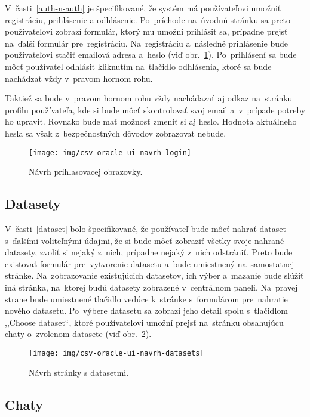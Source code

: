 V~časti~\ref{auth-n-auth} je špecifikované, že systém má používateľovi umožniť registráciu, prihlásenie a odhlásenie. Po~príchode na~úvodnú stránku sa preto používateľovi zobrazí formulár, ktorý mu umožní prihlásiť sa, prípadne prejsť na~ďalší formulár pre~registráciu. Na~registráciu a~následné prihlásenie bude používateľovi stačiť emailová adresa a~heslo (viď obr.~\ref{csv-oracle-ui-navrh-login}). Po~prihlásení sa bude môcť používateľ odhlásiť kliknutím na~tlačidlo odhlásenia, ktoré sa bude nachádzať vždy v~pravom hornom rohu.

Taktiež sa bude v~pravom hornom rohu vždy nachádazať aj odkaz na~stránku profilu používateľa, kde si bude môcť skontrolovať svoj email a~v~prípade potreby ho upraviť. Rovnako bude mať možnosť zmeniť si aj heslo. Hodnota aktuálneho hesla sa však z~bezpečnostných dôvodov zobrazovať nebude.

\begin{figure}[H]\centering
\texttt{[image: img/csv-oracle-ui-navrh-login]}
\caption{Návrh prihlasovacej obrazovky.}
\label{csv-oracle-ui-navrh-login}
\end{figure}

\subsection{Datasety}

V~časti~\ref{dataset} bolo špecifikované, že používateľ bude môcť nahrať dataset s~ďalšími voliteľnými údajmi, že si bude môcť zobraziť všetky svoje nahrané datasety, zvoliť si nejaký z~nich, prípadne nejaký z~nich odstrániť. Preto bude existovať formulár pre~vytvorenie datasetu a~bude umiestnený na~samostatnej stránke. Na~zobrazovanie existujúcich datasetov, ich výber a~mazanie bude slúžiť iná stránka, na~ktorej budú datasety zobrazené v~centrálnom paneli. Na~pravej strane bude umiestnené tlačidlo vedúce k~stránke s~formulárom pre~nahratie nového datasetu. Po~výbere datasetu sa zobrazí jeho detail spolu s~tlačidlom ,,Choose dataset``, ktoré používateľovi umožní prejsť na~stránku obsahujúcu chaty o~zvolenom datasete (viď obr.~\ref{csv-oracle-ui-navrh-datasets}).

\begin{figure}[H]\centering
\texttt{[image: img/csv-oracle-ui-navrh-datasets]}
\caption{Návrh stránky s datasetmi.}
\label{csv-oracle-ui-navrh-datasets}
\end{figure}

\subsection{Chaty}

